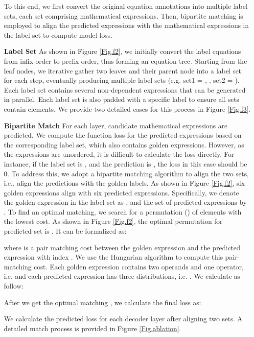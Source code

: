 \documentclass[11pt]{article}
\begin{document}
To this end, we first convert the original equation annotations into multiple label sets, each set comprising  mathematical expressions. Then, bipartite matching is employed to align the  predicted expressions with the  mathematical expressions in the label set to compute model loss.

\textbf{Label Set} 
As shown in Figure \ref{Fig.f2}, we initially convert the label equations from infix order to prefix order, thus forming an equation tree. Starting from the leaf nodes, we iterative gather two leaves and their parent node into a label set for each step, eventually producing multiple label sets (e.g. set1 = , , set2 = ). Each label set contains several non-dependent expressions that can be generated in parallel. Each label set is also padded with a specific label  to ensure all sets contain  elements. We provide two detailed cases for this process in Figure \ref{Fig.f3}.

\textbf{Bipartite Match} For each layer,  candidate mathematical expressions are predicted. We compute the function loss for the  predicted expressions based on the corresponding label set, which also contains  golden expressions. However, as the  expressions are unordered, it is difficult to calculate the loss directly. For instance, if the label set is , and the prediction is , the loss in this case should be 0. To address this, we adopt a bipartite matching algorithm to align the two sets, i.e., align the  predictions with the  golden labels. As shown in Figure \ref{Fig.f2}, six golden expressions align with six predicted expressions. Specifically, we denote the golden expression in the label set as , and the set of predicted expressions by . To find an optimal matching, we search for a permutation () of  elements with the lowest cost. As shown in Figure \ref{Fig.f2}, the optimal permutation for predicted set is . It can be formalized as:

where  is a pair matching cost between the golden expression  and the predicted expression  with index . We use the Hungarian algorithm \citep{kuhn1955hungarian} to compute this pair-matching cost. Each golden expression contains two operands and one operator, i.e.  and each predicted expression has three distributions, i.e. . We calculate  as follow:


After we get the optimal matching , we calculate the final loss  as:


We calculate the predicted loss for each decoder layer after aligning two sets. A detailed match process is provided in Figure \ref{Fig.ablation}. 
\end{document}
